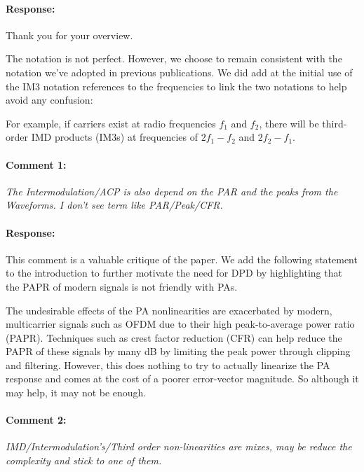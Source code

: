 \documentclass[]{article}
\begin{document}
\paragraph{Response:}
Thank you for your overview. 

The notation is not perfect. However, we choose to remain consistent with the notation we've adopted in previous publications. We did add at the initial use of the IM3 notation references to the frequencies to link the two notations to help avoid any confusion:

{\color{red} For example, if carriers exist at radio frequencies $f_1$ and $f_2$, there will be third-order IMD products (IM3s) at frequencies of $2f_1 - f_2$ and $2f_2 - f_1$.}



\paragraph{Comment 1:}\textit{The Intermodulation/ACP is also depend on the PAR and the peaks from the Waveforms. I don't see term like PAR/Peak/CFR.}

\paragraph{Response:}
This comment is a valuable critique of the paper. We add the following statement to the introduction to further motivate the need for DPD by highlighting that the PAPR of modern signals is not friendly with PAs. 
 
{\color{red} The undesirable effects of the PA nonlinearities are exacerbated by modern, multicarrier signals such as OFDM due to their high peak-to-average power ratio (PAPR). Techniques such as crest factor reduction (CFR) can help reduce the PAPR of these signals by many dB by limiting the peak power through clipping and filtering. However, this does nothing to try to actually linearize the PA response and comes at the cost of a poorer error-vector magnitude. So although it may help, it may not be enough.} 

\paragraph{Comment 2:}\textit{IMD/Intermodulation's/Third order non-linearities are mixes, may be reduce the complexity and stick to one of them.}
\end{document}
